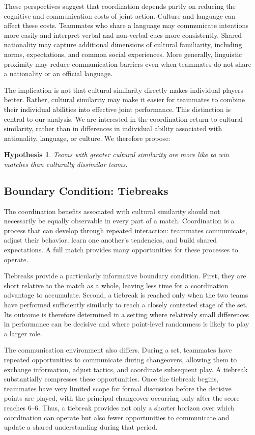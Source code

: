 \documentclass[10pt]{article}
\newtheorem{hypothesis}{Hypothesis}
\begin{document}
These perspectives suggest that coordination depends partly on reducing the cognitive and communication costs of joint action. Culture and language can affect these costs. Teammates who share a language may communicate intentions more easily and interpret verbal and non-verbal cues more consistently. Shared nationality may capture additional dimensions of cultural familiarity, including norms, expectations, and common social experiences. More generally, linguistic proximity may reduce communication barriers even when teammates do not share a nationality or an official language.

The implication is not that cultural similarity directly makes individual players better. Rather, cultural similarity may make it easier for teammates to combine their individual abilities into effective joint performance. This distinction is central to our analysis. We are interested in the coordination return to cultural similarity, rather than in differences in individual ability associated with nationality, language, or culture. We therefore propose:
\begin{hypothesis}
 Teams with greater cultural similarity are more like to win matches  than culturally dissimilar teams.
\end{hypothesis}
\subsection{Boundary Condition:  Tiebreaks}
The coordination benefits associated with cultural similarity should not necessarily be equally observable in every part of a match. Coordination is a process that can develop through repeated interaction: teammates communicate, adjust their behavior, learn one another's tendencies, and build shared expectations. A full match provides many opportunities for these processes to operate.

Tiebreaks provide a particularly informative boundary condition.  First, they are short relative to the match as a whole, leaving less time for a coordination advantage to accumulate. Second, a tiebreak is reached only when the two teams have performed sufficiently similarly to reach a closely contested stage of the set. Its outcome is therefore determined in a setting where relatively small differences in performance can be decisive and where point-level randomness is likely to play a larger role.

The communication environment also differs. During a set, teammates have repeated opportunities to communicate during changeovers, allowing them to exchange information, adjust tactics, and coordinate subsequent play. A tiebreak substantially compresses these opportunities. Once the tiebreak begins, teammates have very limited scope for formal discussion before the decisive points are played, with the principal changeover occurring only after the score reaches 6–6. Thus, a tiebreak provides not only a shorter horizon over which coordination can operate but also fewer opportunities to communicate and update a shared understanding during that period.
\end{document}
